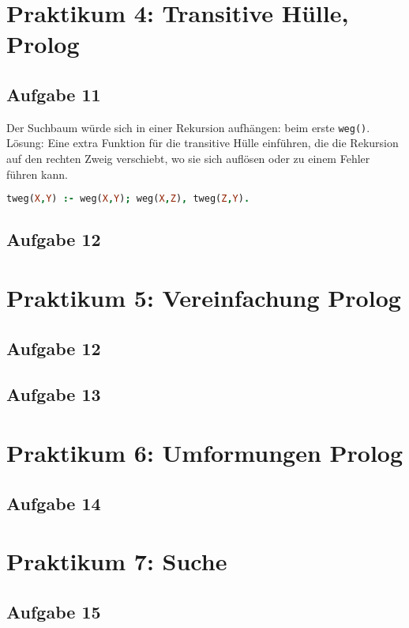 \documentclass{scrreprt}
\begin{document}
\chapter{Praktikum 4: Transitive Hülle, Prolog}

\section{Aufgabe 11}
Der Suchbaum würde sich in einer Rekursion aufhängen: beim erste \lstinline$weg()$.\\
Lösung: Eine extra Funktion für die transitive Hülle einführen, die die Rekursion auf den rechten Zweig verschiebt, wo sie sich auflösen oder zu einem Fehler führen kann.
\begin{lstlisting}[language=Prolog]
tweg(X,Y) :- weg(X,Y); weg(X,Z), tweg(Z,Y).
\end{lstlisting}

\section{Aufgabe 12}

\chapter{Praktikum 5: Vereinfachung Prolog}

\section{Aufgabe 12}

\section{Aufgabe 13}



\chapter{Praktikum 6: Umformungen Prolog}
\section{Aufgabe 14}

\chapter{Praktikum 7: Suche}
\section{Aufgabe 15}

\end{document}
